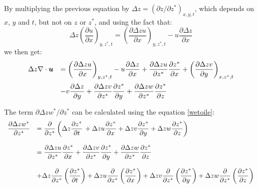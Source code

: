 By multiplying the previous equation by $\Delta z=(\partial z/\partial z^{\ast})_{x,y,t}$,
which depends on $x$, $y$ and $t$, but not on $z$ or $z^{\ast}$, and using the fact that:
\begin{equation}
\Delta z\left(  \dfrac{\partial u}{\partial x}\right)_{y,z^{\ast},t}=\left(
\dfrac{\partial \Delta z u}{\partial x}\right)_{y,z^{\ast},t}-u\dfrac{\partial \Delta z}{\partial x}
\end{equation}
we then get:%
\begin{equation}
\begin{array}{ll}
\Delta z\Div\vec{u} & =\left(\dfrac{\partial \Delta z u}{\partial
x}\right)_{y,z^{\ast},t}-u\dfrac{\partial \Delta z}{\partial x}+
\dfrac{\partial \Delta zu}{\partial z^{\ast}}\dfrac{\partial z^{\ast}}{\partial x}
+\left(\dfrac{\partial \Delta zv}{\partial y}\right)_{x,z^{\ast},t}\medskip \\
& -v\dfrac{\partial \Delta z}{\partial y}+
\dfrac{\partial \Delta z v}{\partial z^{\ast}}\dfrac{\partial z^{\ast}}{\partial y}
+\dfrac{\partial \Delta zw}{\partial z^{\ast}}\dfrac{\partial z^{\ast}}{\partial z} \label{toto}%
\end{array}
\end{equation}


The term $\partial \Delta zw^{\ast}/\partial z^{\ast}$ can be calculated using
the equation \eqref{wetoile}:%
\begin{equation}
\begin{array}{ll}
 \dfrac{\partial \Delta zw^{\ast}}{\partial z^{\ast}}&=
\dfrac{\partial}{\partial z^{\ast}}\left(  \Delta z\dfrac{\partial
z^{\ast}}{\partial t}\,+ \Delta zu\dfrac{\partial z^{\ast}}{\partial x}+\Delta z
v\dfrac{\partial z^{\ast}}{\partial y}+ \Delta zw\dfrac{\partial z^{\ast}%
}{\partial z}\right)\bigskip\\
&= \dfrac{\partial \Delta zu}{\partial z^{\ast}}
\dfrac{\partial z^{\ast}}{\partial x}+\dfrac{\partial \Delta zv}{\partial
z^{\ast}}\dfrac{\partial z^{\ast}}{\partial y}+
\dfrac{\partial \Delta zw}{\partial z^{\ast}}\dfrac{\partial
z^{\ast}}{\partial z}\bigskip\\
&+\Delta z\dfrac{\partial}{\partial z^{\ast}}\left(  \dfrac{\partial z^{\ast}%
}{\partial t}\right)  + \Delta zu\dfrac{\partial}{\partial z^{\ast}}\left(
\dfrac{\partial z^{\ast}}{\partial x}\right)  + \Delta zv\dfrac{\partial
}{\partial z^{\ast}}\left(  \dfrac{\partial z^{\ast}}{\partial y}\right)
+\Delta zw\dfrac{\partial}{\partial z^{\ast}}\left(  \dfrac{\partial z^{\ast}%
}{\partial z}\right)
\end{array}
\end{equation}

